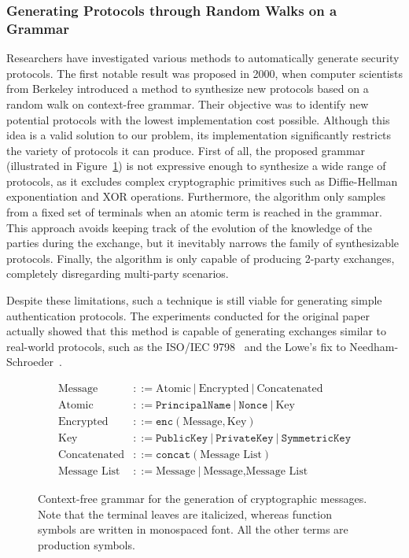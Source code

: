 \subsubsection{Generating Protocols through Random Walks on a Grammar}
Researchers have investigated various methods to automatically generate security protocols. The first notable result was proposed in 2000, when computer scientists from Berkeley introduced a method to synthesize new protocols based on a random walk on context-free grammar. Their objective was to identify new potential protocols with the lowest implementation cost possible. Although this idea is a valid solution to our problem, its implementation significantly restricts the variety of protocols it can produce. First of all, the proposed grammar (illustrated in Figure~\ref{fig:messagegrammar}) is not expressive enough to synthesize a wide range of protocols, as it excludes complex cryptographic primitives such as Diffie-Hellman exponentiation and XOR operations. Furthermore, the algorithm only samples from a fixed set of terminals when an atomic term is reached in the grammar. This approach avoids keeping track of the evolution of the knowledge of the parties during the exchange, but it inevitably narrows the family of synthesizable protocols. Finally, the algorithm is only capable of producing 2-party exchanges, completely disregarding multi-party scenarios.

Despite these limitations, such a technique is still viable for generating simple authentication protocols. The experiments conducted for the original paper actually showed that this method is capable of generating exchanges similar to real-world protocols, such as the ISO/IEC 9798~\cite{ISO9798} and the Lowe's fix to Needham-Schroeder~\cite{lowe1995attack}.

\begin{figure}
    \begin{align*}
        \text{Message} &::= \text{Atomic} \  | \  \text{Encrypted} \ | \ \text{Concatenated}\\
        \text{Atomic} &::= \texttt{PrincipalName} \ | \ \texttt{Nonce} \ | \ \text{Key}\\
        \text{Encrypted} &::= \texttt{enc}(\text{Message}, \text{Key})\\
        \text{Key} &::= \texttt{PublicKey} \  | \ \texttt{PrivateKey} \ | \ \texttt{SymmetricKey}\\
        \text{Concatenated} &::= \texttt{concat}(\text{Message List})\\
        \text{Message List} &::= \text{Message} \ | \ \text{Message} \texttt{,} \text{Message List}
    \end{align*}
    \caption{Context-free grammar for the generation of cryptographic messages. Note that the terminal leaves are italicized, whereas function symbols are written in monospaced font. All the other terms are production symbols.}
    \label{fig:messagegrammar}
\end{figure}


